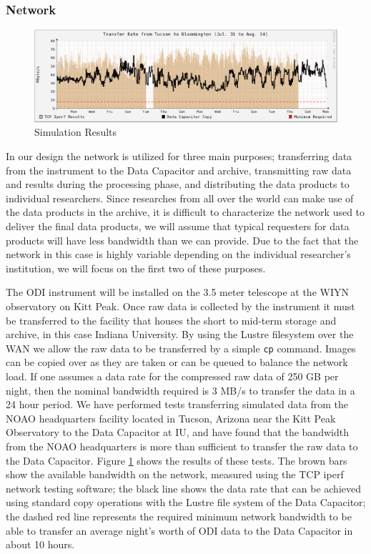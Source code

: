 \documentclass[10pt,conference]{IEEEtran}
\begin{document}
\subsubsection{Network}\label{sec:network}
\begin{figure}[t]
\centering
\includegraphics[width=6in]{network_throughput.eps}
\caption{Simulation Results}
\label{fig:network}
\end{figure}

In our design the network is utilized for three main purposes; transferring data from the instrument to the Data Capacitor and archive, transmitting raw data and results during the processing phase, and distributing the data products to individual researchers. Since researches from all over the world can make use of the data products in the archive, it is difficult to characterize the network used to deliver the final data products, we will assume that typical requesters for data products will have less bandwidth than we can provide. Due to the fact that the network in this case is highly variable depending on the individual researcher's institution, we will focus on the first two of these purposes. 

The ODI instrument will be installed on the 3.5 meter telescope at the WIYN observatory on Kitt Peak. Once raw data is collected by the instrument it must be transferred to the facility that houses the short to mid-term storage and archive, in this case Indiana University. By using the Lustre filesystem over the WAN we allow the raw data to be transferred by a simple {\tt cp} command. Images can be copied over as they are taken or can be queued to balance the network load. If one assumes a data rate for the compressed raw data of 250 GB per night, then the nominal bandwidth required is 3 MB/s to transfer the data in a 24 hour period. We have performed tests transferring simulated data from the NOAO headquarters facility located in Tucson, Arizona near the Kitt Peak Observatory to the Data Capacitor at IU, and have found that the bandwidth from the NOAO headquarters is more than sufficient to transfer the raw data to the Data Capacitor. Figure \ref{fig:network} shows the results of these tests. The brown bars show the available bandwidth on the network, measured using the TCP iperf network testing software; the black line shows the data rate that can be achieved using standard copy operations with the Lustre file system of the Data Capacitor; the dashed red line represents the required
minimum network bandwidth to be able to transfer an average night's worth of ODI data to
the Data Capacitor in about 10 hours.
\end{document}
